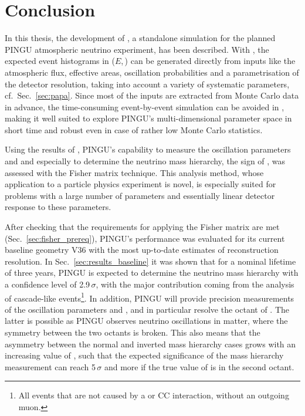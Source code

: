 \chapter{Conclusion}
\label{sec:conclusion}

In this thesis, the development of \papa, a standalone simulation for the
planned PINGU atmospheric neutrino experiment, has been described. With \papa,
the expected event histograms in ($E$,\,\coszen) can be generated directly from
inputs like the atmospheric flux, effective areas, oscillation probabilities
and a parametrisation of the detector resolution, taking into account a variety
of systematic parameters, cf.\ Sec.~\ref{sec:papa}. Since most of the inputs are
extracted from Monte Carlo data in advance, the time-consuming event-by-event
simulation can be avoided in \papa, making it well suited to explore PINGU's
multi-dimensional parameter space in short time and robust even in case of
rather low Monte Carlo statistics.

Using the results of \papa, PINGU's capability to measure the oscillation
parameters  and  and especially to determine the neutrino mass
hierarchy, \ie the sign of , was assessed with the Fisher matrix
technique. This analysis method, whose application to a particle physics
experiment is novel, is especially suited for problems with a large number of
parameters and essentially linear detector response to these parameters.

After checking that the requirements for applying the Fisher matrix are met
(Sec.~\ref{sec:fisher_prereq}), PINGU's performance was evaluated for its
current baseline geometry V36 with the most up-to-date estimates of
reconstruction resolution. In Sec.~\ref{sec:results_baseline} it was shown
that for a nominal lifetime of three years, PINGU is expected to determine the
neutrino mass hierarchy with a confidence level of 2.9\,$\sigma$, with the major
contribution coming from the analysis of cascade-like events\footnote{All events
that are not caused by a \numu or \numubar CC interaction, \ie without an
outgoing muon.}. In addition, PINGU will provide precision measurements of the
oscillation parameters  and , and in particular resolve the
octant of . The latter is possible as PINGU observes neutrino
oscillations in matter, where the symmetry between the two octants is broken.
This also means that the asymmetry between the normal and inverted mass
hierarchy cases grows with an increasing value of , such that the
expected significance of the mass hierarchy measurement can reach 5\,$\sigma$
and more if the true value of  is in the second octant.